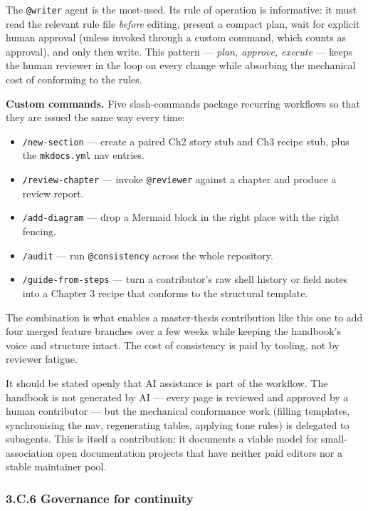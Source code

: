 The \texttt{@writer} agent is the most-used. Its rule of operation is
informative: it must read the relevant rule file \emph{before} editing,
present a compact plan, wait for explicit human approval (unless invoked
through a custom command, which counts as approval), and only then
write. This pattern --- \emph{plan, approve, execute} --- keeps the
human reviewer in the loop on every change while absorbing the
mechanical cost of conforming to the rules.

\textbf{Custom commands.} Five slash-commands package recurring
workflows so that they are issued the same way every time:

\begin{itemize}
\tightlist
\item
  \texttt{/new-section} --- create a paired Ch2 story stub and Ch3
  recipe stub, plus the \texttt{mkdocs.yml} nav entries.
\item
  \texttt{/review-chapter} --- invoke \texttt{@reviewer} against a
  chapter and produce a review report.
\item
  \texttt{/add-diagram} --- drop a Mermaid block in the right place with
  the right fencing.
\item
  \texttt{/audit} --- run \texttt{@consistency} across the whole
  repository.
\item
  \texttt{/guide-from-steps} --- turn a contributor's raw shell history
  or field notes into a Chapter 3 recipe that conforms to the structural
  template.
\end{itemize}

The combination is what enables a master-thesis contribution like this
one to add four merged feature branches over a few weeks while keeping
the handbook's voice and structure intact. The cost of consistency is
paid by tooling, not by reviewer fatigue.

It should be stated openly that AI assistance is part of the workflow.
The handbook is not generated by AI --- every page is reviewed and
approved by a human contributor --- but the mechanical conformance work
(filling templates, synchronising the nav, regenerating tables, applying
tone rules) is delegated to subagents. This is itself a contribution: it
documents a viable model for small-association open documentation
projects that have neither paid editors nor a stable maintainer pool.

\hypertarget{c.6-governance-for-continuity}{%
\subsubsection{3.C.6 Governance for
continuity}\label{c.6-governance-for-continuity}}

